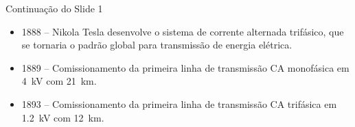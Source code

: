\begin{frame}{Continuação do Slide 1}
    \begin{itemize}
        \item<1|alert@1> 1888 -- Nikola Tesla desenvolve o sistema de corrente alternada trifásico, que se tornaria o padrão global para transmissão de energia elétrica.
        \item<2|alert@2> 1889 -- Comissionamento da primeira linha de transmissão CA monofásica em 4~kV com 21~km.
        \item<3|alert@3> 1893 -- Comissionamento da primeira linha de transmissão CA trifásica em 1.2~kV com 12~km.
    \end{itemize}
\end{frame}
